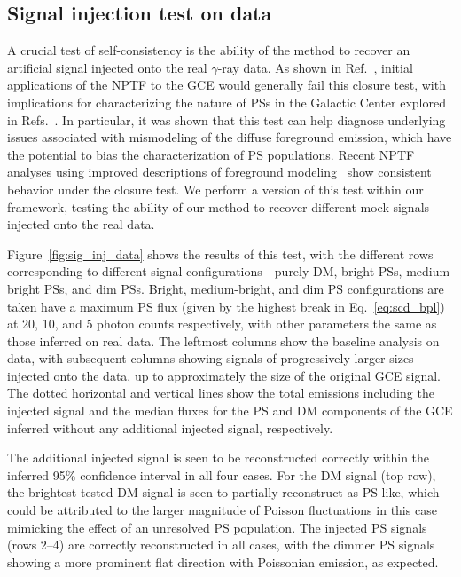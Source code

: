 \documentclass[prd,aps,10pt,nofootinbib,twocolumn,superscriptaddress,preprintnumbers,balancelastpage,longbibliography]{revtex4-1}
\begin{document}
\subsection{Signal injection test on data}
\label{sec:sig-injection}

A crucial test of self-consistency is the ability of the method to recover an artificial signal injected onto the real $\gamma$-ray data. As shown in Ref.~\cite{Leane:2019xiy}, initial applications of the NPTF to the GCE would generally fail this closure test, with implications for characterizing the nature of PSs in the Galactic Center explored in Refs.~\cite{Chang:2019ars,Buschmann:2020adf}. In particular, it was shown that this test can help diagnose underlying issues associated with mismodeling of the diffuse foreground emission, which have the potential to bias the characterization of PS populations. Recent NPTF analyses using improved descriptions of foreground modeling~\cite{Buschmann:2020adf} show consistent behavior under the closure test. We perform a version of this test within our framework, testing the ability of our method to recover different mock signals injected onto the real \Fermi data.

Figure~\ref{fig:sig_inj_data} shows the results of this test, with the different rows corresponding to different signal configurations---purely DM, bright PSs, medium-bright PSs, and dim PSs. Bright, medium-bright, and dim PS configurations are taken have a maximum PS flux (given by the highest break in Eq.~\eqref{eq:scd_bpl}) at 20, 10, and 5 photon counts respectively, with other parameters the same as those inferred on real \Fermi data. The leftmost columns show the baseline analysis on \Fermi data, with subsequent columns showing signals of progressively larger sizes injected onto the data, up to approximately the size of the original GCE signal. The dotted horizontal and vertical lines show the total emissions including the injected signal and the median fluxes for the PS and DM components of the GCE inferred without any additional injected signal, respectively. 

The additional injected signal is seen to be reconstructed correctly within the inferred 95\% confidence interval in all four cases. For the DM signal (top row), the brightest tested DM signal is seen to partially reconstruct as PS-like, which could be attributed to the larger magnitude of Poisson fluctuations in this case mimicking the effect of an unresolved PS population. The injected PS signals (rows 2--4) are correctly reconstructed in all cases, with the dimmer PS signals showing a more prominent flat direction with Poissonian emission, as expected.
\end{document}
